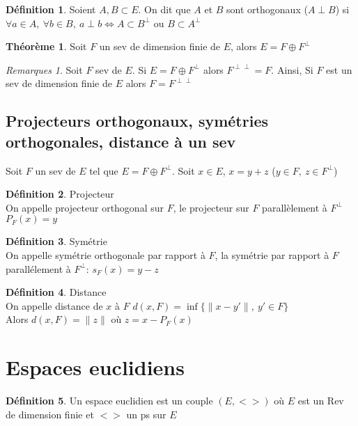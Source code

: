 \documentclass[fleqn]{article}
\theoremstyle{definition} \newtheorem*{defi}{D\'efinition}
\theoremstyle{definition} \newtheorem*{theo}{Th\'eor\`eme}
\theoremstyle{definition} \newtheorem*{coro}{Corollaire}
\theoremstyle{remark} \newtheorem*{rqs}{Remarques}
\theoremstyle{definition} \newtheorem*{prop}{Propri\'et\'e}
\begin{document}
\begin{defi} Soient $A,B \subset E$. On dit que $A$ et $B$ sont orthogonaux ($A \perp B$) si $\forall a \in A,\ \forall b \in B,\ a \perp b
	\Leftrightarrow A \subset B^\perp$ ou $B \subset A^\perp$
\end{defi}

\begin{theo} Soit $F$ un sev de dimension finie de $E$, alors $E = F \oplus F^\perp$
	\begin{rqs}
		Soit $F$ sev de $E$. Si $E = F \oplus F^\perp$ alors $F^{\perp \perp} = F$. Ainsi, Si $F$ est un sev de dimension finie de $E$ alors
		$F = F^{\perp \perp}$
	\end{rqs}
\end{theo}

\subsection{Projecteurs orthogonaux, sym\'etries orthogonales, distance \`a un sev}
Soit $F$ un sev de $E$ tel que $E = F \oplus F^\perp$. Soit $x \in E$, $x = y + z$ ($y \in F ,\ z \in F^\perp$)
\begin{defi} Projecteur \\
	On appelle projecteur orthogonal sur $F$, le projecteur sur $F$ parall\`element \`a $F^{\perp}$ \\
	$P_F(x) = y$
\end{defi}
\begin{defi} Sym\'etrie \\
	On appelle sym\'etrie orthogonale par rapport \`a $F$, la sym\'etrie par rapport \`a $F$ parall\'element \`a $F^\perp$: $s_F(x) = y - z$
\end{defi}
\begin{defi} Distance \\
	On appelle distance de $x$ \`a $F$ $d(x,F) = \inf \{ \|x-y'\| ,\ y' \in F\}$ \\
	Alors $d(x,F) = \|z\|$ o\`u $z = x - P_F(x)$
\end{defi}


\section{Espaces euclidiens}

\begin{defi}
	Un espace euclidien est un couple $(E, <>)$ o\`u $E$ est un Rev de dimension finie et $<>$ un ps sur $E$
\end{defi}
\end{document}
